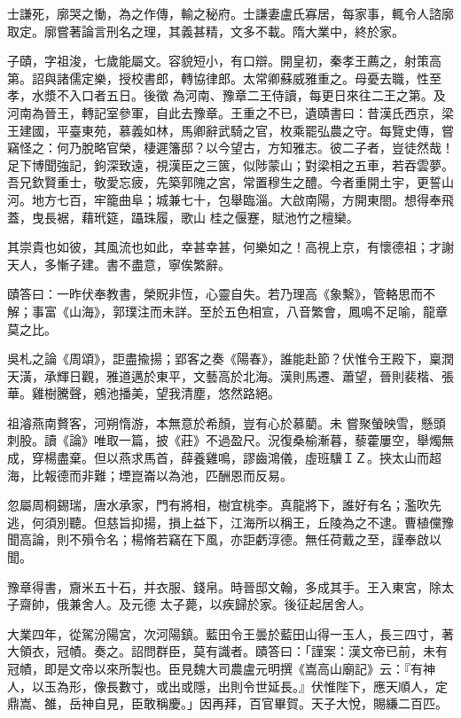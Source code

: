 \begin{pinyinscope}
 士謙死，廓哭之慟，為之作傳，輸之秘府。士謙妻盧氏寡居，每家事，輒令人諮廓取定。廓嘗著論言刑名之理，其義甚精，文多不載。隋大業中，終於家。



 子賾，字祖浚，七歲能屬文。容貌短小，有口辯。開皇初，秦孝王薦之，射策高第。詔與諸儒定樂，授校書郎，轉協律郎。太常卿蘇威雅重之。母憂去職，性至孝，水漿不入口者五日。後徵
 為河南、豫章二王侍讀，每更日來往二王之第。及河南為晉王，轉記室參軍，自此去豫章。王重之不已，遺賾書曰：昔漢氏西京，梁王建國，平臺東苑，慕義如林，馬卿辭武騎之官，枚乘罷弘農之守。每覽史傳，嘗竊怪之：何乃脫略官榮，棲遲籓邸？以今望古，方知雅志。彼二子者，豈徒然哉！足下博聞強記，鉤深致遠，視漢臣之三篋，似陟蒙山；對梁相之五車，若吞雲夢。吾兄欽賢重士，敬愛忘疲，先築郭隗之宮，常置穆生之醴。今者重開土宇，更誓山河。地方七百，牢籠曲阜；城兼七十，包舉臨淄。大啟南陽，方開東閤。想得奉飛蓋，曳長裾，藉玳筵，躡珠履，歌山
 桂之偃蹇，賦池竹之檀欒。



 其崇貴也如彼，其風流也如此，幸甚幸甚，何樂如之！高視上京，有懷德祖；才謝天人，多慚子建。書不盡意，寧俟繁辭。



 賾答曰：一昨伏奉教書，榮貺非恆，心靈自失。若乃理高《象繫》，管輅思而不解；事富《山海》，郭璞注而未詳。至於五色相宣，八音繁會，鳳鳴不足喻，龍章莫之比。



 吳札之論《周頌》，詎盡揄揚；郢客之奏《陽春》，誰能赴節？伏惟令王殿下，稟潤天潢，承輝日觀，雅道邁於東平，文藝高於北海。漢則馬遷、蕭望，晉則裴楷、張華。雞樹騰聲，鵷池播美，望我清塵，悠然路絕。



 祖濬燕南贅客，河朔惰游，本無意於希顏，豈有心於慕藺。未
 嘗聚螢映雪，懸頭刺股。讀《論》唯取一篇，披《莊》不過盈尺。況復桑榆漸暮，藜藿屢空，舉燭無成，穿楊盡棄。但以燕求馬首，薛養雞鳴，謬齒鴻儀，虛班驥ＩＺ。挾太山而超海，比報德而非難；堙崑崙以為池，匹酬恩而反易。



 忽屬周桐錫瑞，唐水承家，門有將相，樹宜桃李。真龍將下，誰好有名；濫吹先逃，何須別聽。但慈旨抑揚，損上益下，江海所以稱王，丘陵為之不逮。曹植儻豫聞高論，則不殞令名；楊脩若竊在下風，亦詎虧淳德。無任荷戴之至，謹奉啟以聞。



 豫章得書，齎米五十石，并衣服、錢帛。時晉邸文翰，多成其手。王入東宮，除太子齋帥，俄兼舍人。及元德
 太子薨，以疾歸於家。後征起居舍人。



 大業四年，從駕汾陽宮，次河陽鎮。藍田令王曇於藍田山得一玉人，長三四寸，著大領衣，冠幘。奏之。詔問群臣，莫有識者。賾答曰：「謹案：漢文帝已前，未有冠幘，即是文帝以來所製也。臣見魏大司農盧元明撰《嵩高山廟記》云：『有神人，以玉為形，像長數寸，或出或隱，出則令世延長。』伏惟陛下，應天順人，定鼎嵩、雒，岳神自見，臣敢稱慶。」因再拜，百官畢賀。天子大悅，賜縑二百匹。




\end{pinyinscope}
